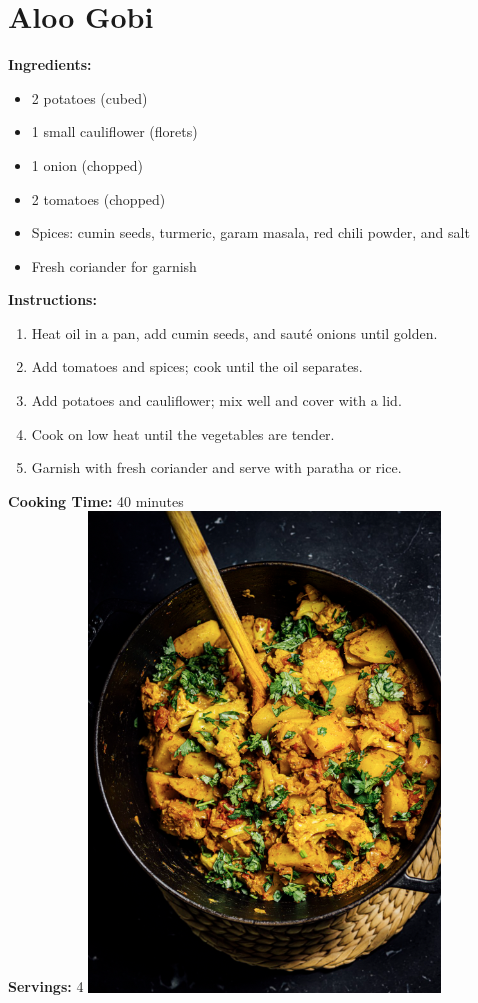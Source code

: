 \documentclass[12pt]{article}
\begin{document}
\section*{Aloo Gobi}
\textbf{Ingredients:}
\begin{itemize}
    \item 2 potatoes (cubed)
    \item 1 small cauliflower (florets)
    \item 1 onion (chopped)
    \item 2 tomatoes (chopped)
    \item Spices: cumin seeds, turmeric, garam masala, red chili powder, and salt
    \item Fresh coriander for garnish
\end{itemize}

\textbf{Instructions:}
\begin{enumerate}
    \item Heat oil in a pan, add cumin seeds, and sauté onions until golden.
    \item Add tomatoes and spices; cook until the oil separates.
    \item Add potatoes and cauliflower; mix well and cover with a lid.
    \item Cook on low heat until the vegetables are tender.
    \item Garnish with fresh coriander and serve with paratha or rice.
\end{enumerate}

\textbf{Cooking Time:} 40 minutes \\
\textbf{Servings:} 4
\includegraphics[width=0.7\textwidth]{aloo_gobi.png} 
\newpage
\end{document}

